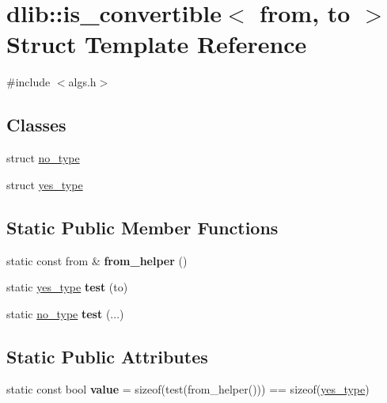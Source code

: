 \hypertarget{structdlib_1_1is__convertible}{
\section{dlib::is\_\-convertible$<$ from, to $>$ Struct Template Reference}
\label{structdlib_1_1is__convertible}
}


{\ttfamily \#include $<$algs.h$>$}\subsection*{Classes}
\begin{DoxyCompactItemize}
\item 
struct \hyperlink{structdlib_1_1is__convertible_1_1no__type}{no\_\-type}
\item 
struct \hyperlink{structdlib_1_1is__convertible_1_1yes__type}{yes\_\-type}
\end{DoxyCompactItemize}
\subsection*{Static Public Member Functions}
\begin{DoxyCompactItemize}
\item 
\hypertarget{structdlib_1_1is__convertible_ae98a3fadf511adb91867eda63298ed7c}{
static const from \& {\bfseries from\_\-helper} ()}
\label{structdlib_1_1is__convertible_ae98a3fadf511adb91867eda63298ed7c}

\item 
\hypertarget{structdlib_1_1is__convertible_a08ea5c4166c14337f7ce85b3ef332a6f}{
static \hyperlink{structdlib_1_1is__convertible_1_1yes__type}{yes\_\-type} {\bfseries test} (to)}
\label{structdlib_1_1is__convertible_a08ea5c4166c14337f7ce85b3ef332a6f}

\item 
\hypertarget{structdlib_1_1is__convertible_a260258f50e6d68da85ec88febe148aa8}{
static \hyperlink{structdlib_1_1is__convertible_1_1no__type}{no\_\-type} {\bfseries test} (...)}
\label{structdlib_1_1is__convertible_a260258f50e6d68da85ec88febe148aa8}

\end{DoxyCompactItemize}
\subsection*{Static Public Attributes}
\begin{DoxyCompactItemize}
\item 
\hypertarget{structdlib_1_1is__convertible_aa64b0f0d97f023a8cfafda29e7360b89}{
static const bool {\bfseries value} = sizeof(test(from\_\-helper())) == sizeof(\hyperlink{structdlib_1_1is__convertible_1_1yes__type}{yes\_\-type})}
\label{structdlib_1_1is__convertible_aa64b0f0d97f023a8cfafda29e7360b89}

\end{DoxyCompactItemize}


